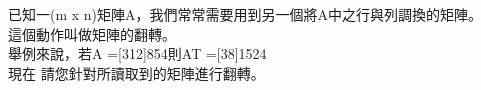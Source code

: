 已知一(m x n)矩陣A，我們常常需要用到另一個將A中之行與列調換的矩陣。\\
這個動作叫做矩陣的翻轉。\\
舉例來說，若A =[312]854則AT =[38]1524\\
現在 請您針對所讀取到的矩陣進行翻轉。\\
